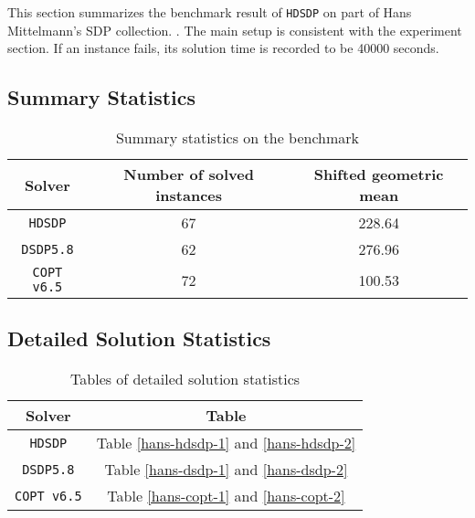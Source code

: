 This section summarizes the benchmark result of \texttt{HDSDP} on part of Hans Mittelmann's SDP collection. \cite{mittelmann2003independent}. The main setup is consistent with the experiment section. If an instance fails, its solution time is recorded to be 40000 seconds.

\subsection{Summary Statistics}

\begin{table}[H]
\caption{Summary statistics on the benchmark}
  \begin{tabular}{ccc}
  \toprule
  Solver & Number of solved instances & Shifted geometric mean \\
  \midrule
  \texttt{HDSDP} & 67 & 228.64 \\
    \texttt{DSDP5.8} & 62 & 276.96 \\
    \texttt{COPT v6.5} & 72 & 100.53 \\
  	\bottomrule
  \end{tabular}	
\end{table}

\subsection{Detailed Solution Statistics}
\begin{table}[H]
\caption{Tables of detailed solution statistics}
  \begin{tabular}{cc}
  \toprule
  Solver & Table \\
  \midrule
   \texttt{HDSDP} & Table \ref{hans-hdsdp-1} and  \ref{hans-hdsdp-2}   \\
    \texttt{DSDP5.8} & Table \ref{hans-dsdp-1} and  \ref{hans-dsdp-2} \\
    \texttt{COPT v6.5} & Table \ref{hans-copt-1} and  \ref{hans-copt-2} \\
  	\bottomrule
  \end{tabular}	
\end{table}

